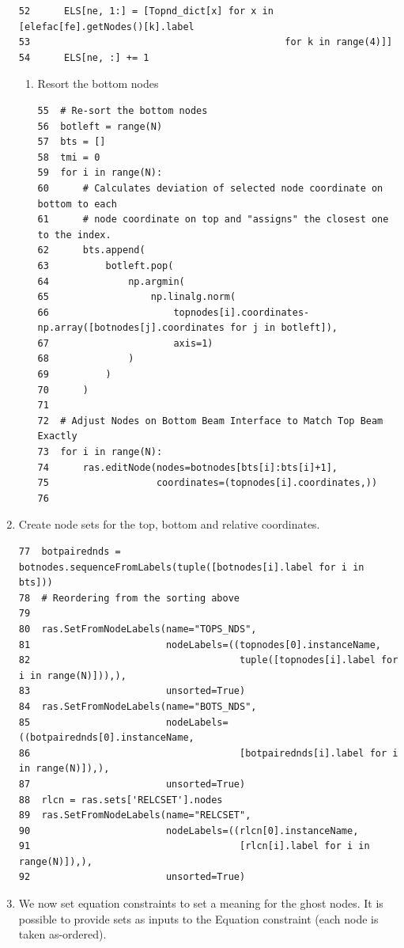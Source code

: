 \documentclass[11pt]{article}
\begin{document}
\begin{enumerate}
\begin{verbatim}
52      ELS[ne, 1:] = [Topnd_dict[x] for x in [elefac[fe].getNodes()[k].label
53                                             for k in range(4)]]
54      ELS[ne, :] += 1
\end{verbatim}
\begin{enumerate}
\item Resort the bottom nodes
\begin{verbatim}
55  # Re-sort the bottom nodes    
56  botleft = range(N)
57  bts = []
58  tmi = 0
59  for i in range(N):
60      # Calculates deviation of selected node coordinate on bottom to each
61      # node coordinate on top and "assigns" the closest one to the index.
62      bts.append(
63          botleft.pop(
64              np.argmin(
65                  np.linalg.norm(
66                      topnodes[i].coordinates-np.array([botnodes[j].coordinates for j in botleft]),
67                      axis=1)
68              )
69          )
70      )
71  
72  # Adjust Nodes on Bottom Beam Interface to Match Top Beam Exactly
73  for i in range(N):
74      ras.editNode(nodes=botnodes[bts[i]:bts[i]+1],
75                   coordinates=(topnodes[i].coordinates,))
76  
\end{verbatim}
\end{enumerate}
\item Create node sets for the top, bottom and relative coordinates.
\begin{verbatim}
77  botpairednds = botnodes.sequenceFromLabels(tuple([botnodes[i].label for i in bts]))
78  # Reordering from the sorting above
79  
80  ras.SetFromNodeLabels(name="TOPS_NDS", 
81                        nodeLabels=((topnodes[0].instanceName, 
82                                     tuple([topnodes[i].label for i in range(N)])),),
83                        unsorted=True)
84  ras.SetFromNodeLabels(name="BOTS_NDS", 
85                        nodeLabels=((botpairednds[0].instanceName, 
86                                     [botpairednds[i].label for i in range(N)]),),
87                        unsorted=True)
88  rlcn = ras.sets['RELCSET'].nodes
89  ras.SetFromNodeLabels(name="RELCSET",
90                        nodeLabels=((rlcn[0].instanceName,
91                                     [rlcn[i].label for i in range(N)]),),
92                        unsorted=True)
\end{verbatim}
\item We now set equation constraints to set a meaning for the ghost nodes.
It is possible to provide sets as inputs to the Equation constraint (each node is taken as-ordered).
\begin{verbatim}

\end{verbatim}
\end{enumerate}
\end{document}
